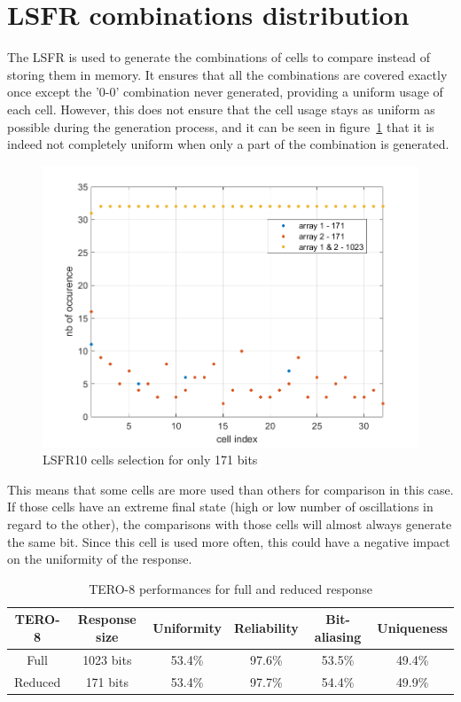 \newpage
\section{LSFR combinations distribution}
\label{appendix:lsfr}

The LSFR is used to generate the combinations of cells to compare instead of storing them in memory. It ensures that all the combinations are covered exactly once except the '0-0' combination never generated, providing a uniform usage of each cell. However, this does not ensure that the cell usage stays as uniform as possible during the generation process, and it can be seen in figure~\ref{fig:cell_occurence} that it is indeed not completely uniform when only a part of the combination is generated. 


\begin{figure}[H]
    \centering
    \includegraphics[width=0.7\linewidth]{images/cell_occurence_171.png}
    \caption{LSFR10 cells selection for only 171 bits}
    \label{fig:cell_occurence}
\end{figure}

This means that some cells are more used than others for comparison in this case. If those cells have an extreme final state (high or low number of oscillations in regard to the other), the comparisons with those cells will almost always generate the same bit. Since this cell is used more often, this could have a negative impact on the uniformity of the response.

\begin{table}[H]  
  \centering
    \begin{tabular}{|c|c|c|c|c|c|}
        \hline
        \textbf{TERO-8} & Response size & Uniformity & Reliability & Bit-aliasing & Uniqueness\\
        \hline
        Full & 1023 bits & 53.4\% & 97.6\% & 53.5\% & 49.4\%\\
        \hline
        Reduced & 171 bits & 53.4\% &97.7\% & 54.4\% & 49.9\%\\
        \hline
    \end{tabular}
   \caption{\label{tab:inter_perf_full_vs_reduce}TERO-8 performances for full and reduced response}
\end{table}

